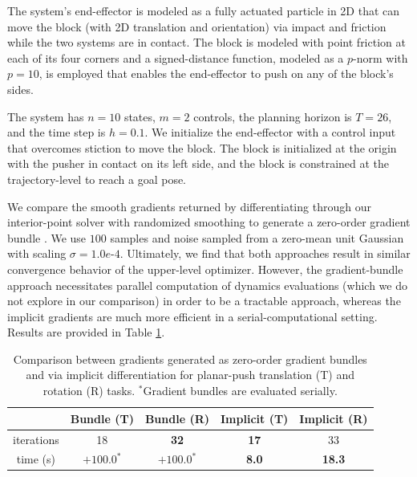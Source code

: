 The system's end-effector is modeled as a fully actuated particle in 2D that can move the block (with 2D translation and orientation) via impact and friction while the two systems are in contact. The block is modeled with point friction at each of its four corners and a signed-distance function, modeled as a $p$-norm with $p=10$, is employed that enables the end-effector to push on any of the block's sides.

The system has $n = 10$ states, $m = 2$ controls, the planning horizon is $T = 26$, and the time step is $h = 0.1$. We initialize the end-effector with a control input that overcomes stiction to move the block. The block is initialized at the origin with the pusher in contact on its left side, and the block is constrained at the trajectory-level to reach a goal pose.

We compare the smooth gradients returned by differentiating through our interior-point solver with randomized smoothing to generate a zero-order gradient bundle \cite{suh2022bundled}. We use $100$ samples and noise sampled from a zero-mean unit Gaussian with scaling $\sigma=1.0e\mbox{-}4$. Ultimately, we find that both approaches result in similar convergence behavior of the upper-level optimizer. However, the gradient-bundle approach necessitates parallel computation of dynamics evaluations (which we do not explore in our comparison) in order to be a tractable approach, whereas the implicit gradients are much more efficient in a serial-computational setting. Results are provided in Table \ref{od_planarpush_results}.

\begin{table}[H]
	\centering
	\caption[Gradient comparison between implicit gradients and gradient bundles for planar-push task]{Comparison between gradients generated as zero-order gradient bundles and via implicit differentiation for planar-push translation (T) and rotation (R) tasks. $^*$Gradient bundles are evaluated serially.}
	\begin{tabular}{c c c c c}
		\toprule
		&
		\textbf{Bundle (T)} &
		\textbf{Bundle (R)} &
		\textbf{Implicit (T)} &
		\textbf{Implicit (R)}
		\\
		\toprule
		iterations & 18 & \textbf{32} & \textbf{17} & 33 \\
		time (s) & $+100.0^*$ & $+100.0^*$ & \textbf{8.0} & \textbf{18.3} \\
		\toprule
	\end{tabular}
	\label{od_planarpush_results}
\end{table}

